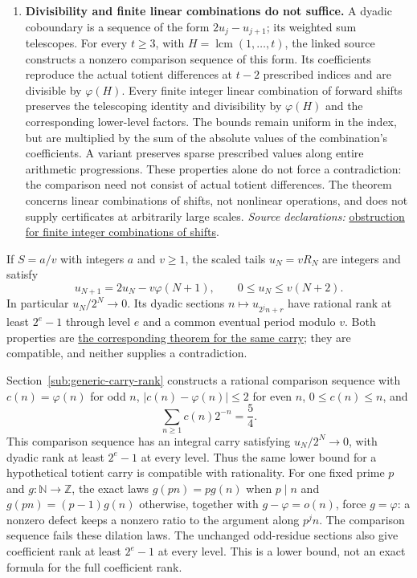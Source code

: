 \documentclass[11pt]{article}
\theoremstyle{plain}
\theoremstyle{definition}
\theoremstyle{remark}
\newcommand{\commit}{99f4bf47422abbd8757cbb22b50ba079d764d3a7}
\newcommand{\repobase}{https://github.com/wcook04/plectis-erdos/blob/\commit}
\newcommand{\N}{\mathbb{N}}
\newcommand{\Z}{\mathbb{Z}}
\newcommand{\ph}{\varphi}
\newcommand{\lcm}{\operatorname{lcm}}
\newcommand{\mword}[4]{\href{\repobase/#1\#L#2}{#4}}
\begin{document}
\begin{enumerate}
\item\label{res:factorideal}
\textbf{Divisibility and finite linear combinations do not suffice.}
A dyadic coboundary is a sequence of the form $2u_j-u_{j+1}$; its weighted
sum telescopes. For every $t\ge3$, with $H=\lcm(1,\ldots,t)$, the linked
source constructs a nonzero comparison sequence of this form. Its
coefficients reproduce the actual totient differences at $t-2$
prescribed indices and are divisible by $\varphi(H)$. Every finite integer
linear combination of forward shifts preserves the telescoping identity and
divisibility by $\varphi(H)$ and the corresponding lower-level factors.
The bounds remain uniform in the index, but are multiplied by the sum
of the absolute values of the combination's coefficients.
A variant preserves sparse prescribed values along entire arithmetic
progressions. These properties alone do not force a contradiction: the
comparison need not consist of actual totient differences. The theorem
concerns linear combinations of shifts, not nonlinear operations, and
does not supply certificates at arbitrarily large scales.
{\footnotesize\emph{Source declarations:}
\mword{Erdos249257/LcmFactorIdealPulseObstruction.lean}{798}{lcm_factorIdeal_finiteRank_shiftAlgebra_not_sufficient}{obstruction for finite integer combinations of shifts}.}
\end{enumerate}

If $S=a/v$ with integers $a$ and $v\ge1$, the scaled tails $u_N=vR_N$
are integers and satisfy
\[
 u_{N+1}=2u_N-v\ph(N+1),\qquad 0\le u_N\le v(N+2).
\]
In particular $u_N/2^N\to0$. Its dyadic sections $n\mapsto u_{2^jn+r}$ have rational rank at
least $2^e-1$ through level $e$ and a common eventual period modulo $v$.
Both properties are
\mword{Erdos249257/TotientTailCarryPeriod.lean}{224}{not_irrational_totientSeries_implies_mod_period_and_unbounded_rank}{the corresponding theorem for the same carry};
they are compatible, and neither supplies a contradiction.

Section~\ref{sub:generic-carry-rank} constructs a rational
comparison sequence with
$c(n)=\ph(n)$ for odd $n$, $|c(n)-\ph(n)|\le2$ for even $n$, $0\le c(n)\le n$,
and
\[
 \sum_{n\ge1}c(n)2^{-n}=\frac54.
\]
This comparison sequence has an integral carry satisfying
$u_N/2^N\to0$, with dyadic rank at least $2^e-1$ at every level. Thus the same lower bound for a hypothetical totient carry is
compatible with rationality. For one fixed prime $p$ and $g:\N\to\Z$, the exact laws
$g(pn)=p g(n)$ when $p\mid n$ and $g(pn)=(p-1)g(n)$ otherwise, together
with $g-\ph=o(n)$, force $g=\ph$: a nonzero defect keeps a nonzero ratio
to the argument along $p^j n$. The comparison sequence fails these dilation laws. The unchanged odd-residue sections
also give coefficient rank at least $2^e-1$ at every level. This is a
lower bound, not an exact formula for the full coefficient rank.
\end{document}

